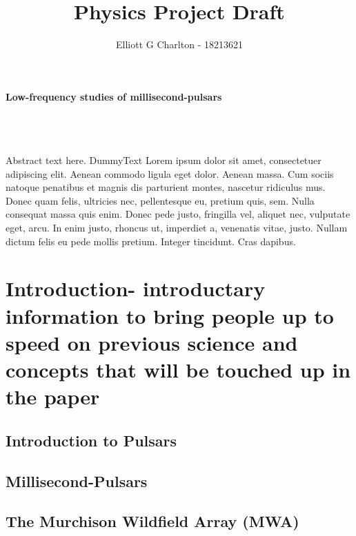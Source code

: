 \documentclass[draft]{article}
\title {Physics Project Draft}
\author{Elliott G Charlton - 18213621}
\newcommand{\pra}{\medskip\\}
\begin{document}
	\begin{titlepage}
	\begin{center}
	\vspace*{\fill}
	{\Huge\textbf{ Low-frequency studies of millisecond-pulsars}} \\
	\bigskip{} \\
	\\
		\vspace*{\fill}
	\end{center}
\bigskip\bigskip\bigskip{} \pra 
Abstract text here. DummyText Lorem ipsum dolor sit amet, 	consectetuer adipiscing elit. Aenean commodo ligula eget dolor. Aenean massa. Cum sociis natoque penatibus et magnis dis parturient montes, nascetur ridiculus mus. Donec quam felis, ultricies nec, pellentesque eu, pretium quis, sem. Nulla consequat massa quis enim. Donec pede justo, fringilla vel, aliquet nec, vulputate eget, arcu. In enim justo, rhoncus ut, imperdiet a, venenatis vitae, justo. Nullam dictum felis eu pede mollis pretium. Integer tincidunt. Cras dapibus.
			
	\end{titlepage}

\maketitle
\tableofcontents{}

\newpage
\section{Introduction- \color{red} introductary information to bring people up to speed on previous science and concepts that will be touched up in the paper}
\subsection{Introduction to Pulsars}
\subsection{Millisecond-Pulsars}
\subsection{The Murchison Wildfield Array (MWA)}
\end{document}
